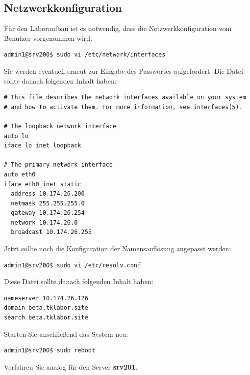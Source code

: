 \subsection{Netzwerkkonfiguration}
Für den Laboraufbau ist es notwendig, dass die Netzwerkkonfiguration vom
Benutzer vorgenommen wird:
\begin{lstlisting}
admin1@srv200$ sudo vi /etc/network/interfaces
\end{lstlisting}
Sie werden eventuell erneut zur Eingabe des Passwortes aufgefordert. Die Datei
sollte danach folgenden Inhalt haben:
\begin{scriptsize}
\begin{lstlisting}
# This file describes the network interfaces available on your system
# and how to activate them. For more information, see interfaces(5).

# The loopback network interface
auto lo
iface lo inet loopback

# The primary network interface
auto eth0
iface eth0 inet static
  address 10.174.26.200
  netmask 255.255.255.0
  gateway 10.174.26.254
  network 10.174.26.0
  broadcast 10.174.26.255
\end{lstlisting}
\end{scriptsize}

Jetzt sollte noch die Konfiguration der Namensauflösung angepasst werden:
\begin{lstlisting}
admin1@srv200$ sudo vi /etc/resolv.conf
\end{lstlisting}
Diese Datei sollte danach folgenden Inhalt haben:
\begin{scriptsize}
\begin{lstlisting}
nameserver 10.174.26.126
domain beta.tklabor.site
search beta.tklabor.site
\end{lstlisting}
\end{scriptsize}
Starten Sie anschließend das System neu:
\begin{lstlisting}
admin1@srv200$ sudo reboot
\end{lstlisting}
Verfahren Sie analog für den Server \textbf{srv201}.

